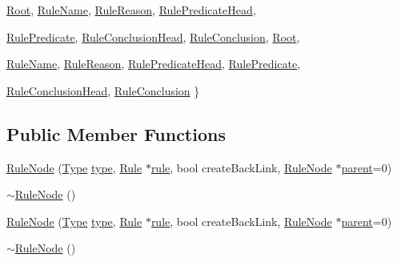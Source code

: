 \begin{DoxyCompactItemize}
\hyperlink{class_rule_node_af5559008a21eeb33044686b245f8e636a981d39e1f15bd7216248bf76b0eb2f87}{Root}, 
\hyperlink{class_rule_node_af5559008a21eeb33044686b245f8e636a9bc7cb7031c6ac294235769e0512703b}{RuleName}, 
\hyperlink{class_rule_node_af5559008a21eeb33044686b245f8e636a4de1d3c98b39dcbc705e55fc1eb2f9ce}{RuleReason}, 
\hyperlink{class_rule_node_af5559008a21eeb33044686b245f8e636ab563e2519924fc6f3b3353caf5a97faa}{RulePredicateHead}, 
\par
\hyperlink{class_rule_node_af5559008a21eeb33044686b245f8e636a1638fb696f3c7bab9abe49750889a72c}{RulePredicate}, 
\hyperlink{class_rule_node_af5559008a21eeb33044686b245f8e636ade4f1a8272f5be0b2eba78bbac6a7c32}{RuleConclusionHead}, 
\hyperlink{class_rule_node_af5559008a21eeb33044686b245f8e636a8a6a915c2d84feec8d0b0ff805c3b50a}{RuleConclusion}, 
\hyperlink{class_rule_node_af5559008a21eeb33044686b245f8e636a981d39e1f15bd7216248bf76b0eb2f87}{Root}, 
\par
\hyperlink{class_rule_node_af5559008a21eeb33044686b245f8e636a9bc7cb7031c6ac294235769e0512703b}{RuleName}, 
\hyperlink{class_rule_node_af5559008a21eeb33044686b245f8e636a4de1d3c98b39dcbc705e55fc1eb2f9ce}{RuleReason}, 
\hyperlink{class_rule_node_af5559008a21eeb33044686b245f8e636ab563e2519924fc6f3b3353caf5a97faa}{RulePredicateHead}, 
\hyperlink{class_rule_node_af5559008a21eeb33044686b245f8e636a1638fb696f3c7bab9abe49750889a72c}{RulePredicate}, 
\par
\hyperlink{class_rule_node_af5559008a21eeb33044686b245f8e636ade4f1a8272f5be0b2eba78bbac6a7c32}{RuleConclusionHead}, 
\hyperlink{class_rule_node_af5559008a21eeb33044686b245f8e636a8a6a915c2d84feec8d0b0ff805c3b50a}{RuleConclusion}
 \}
\end{DoxyCompactItemize}
\subsection*{Public Member Functions}
\begin{DoxyCompactItemize}
\item 
\hyperlink{class_rule_node_a7bf5ae341d70b90dc244ef797f822452}{RuleNode} (\hyperlink{class_rule_node_af5559008a21eeb33044686b245f8e636}{Type} \hyperlink{class_rule_node_ae87a23283ab864a45dad3b6716751d5f}{type}, \hyperlink{class_rule}{Rule} $\ast$\hyperlink{class_rule_node_a5102587db43bf3aede68ec0c24b60a7b}{rule}, bool createBackLink, \hyperlink{class_rule_node}{RuleNode} $\ast$\hyperlink{class_rule_node_a125fb9f6655d872b9f0e7e1991023974}{parent}=0)
\item 
\hyperlink{class_rule_node_a9966a318685dd21fa5e1dba6f605932c}{$\sim$RuleNode} ()
\item 
\hyperlink{class_rule_node_a7bf5ae341d70b90dc244ef797f822452}{RuleNode} (\hyperlink{class_rule_node_af5559008a21eeb33044686b245f8e636}{Type} \hyperlink{class_rule_node_ae87a23283ab864a45dad3b6716751d5f}{type}, \hyperlink{class_rule}{Rule} $\ast$\hyperlink{class_rule_node_a5102587db43bf3aede68ec0c24b60a7b}{rule}, bool createBackLink, \hyperlink{class_rule_node}{RuleNode} $\ast$\hyperlink{class_rule_node_a125fb9f6655d872b9f0e7e1991023974}{parent}=0)
\item 
\hyperlink{class_rule_node_a9966a318685dd21fa5e1dba6f605932c}{$\sim$RuleNode} ()
\end{DoxyCompactItemize}
